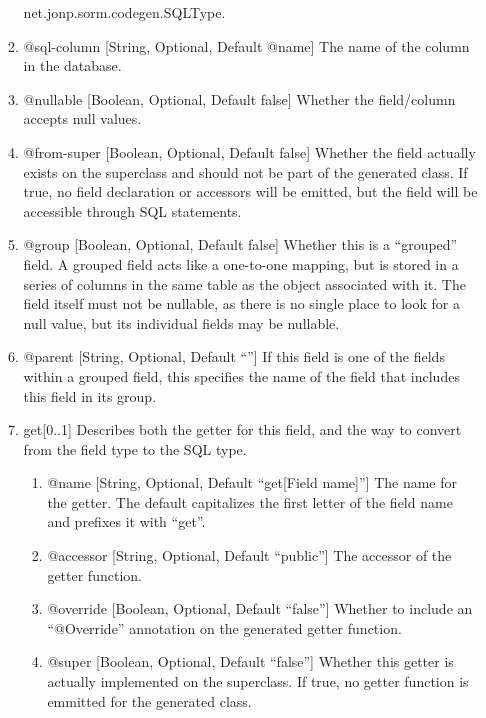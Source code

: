 \documentclass{book}
\begin{document}
\begin{enumerate}
\begin{enumerate}
              net.jonp.sorm.codegen.SQLType.
        \item @sql-column [String, Optional, Default @name] The name of the
              column in the database.
        \item @nullable [Boolean, Optional, Default false] Whether the
              field/column accepts null values.
        \item @from-super [Boolean, Optional, Default false] Whether the field
              actually exists on the superclass and should not be part of the
              generated class. If true, no field declaration or accessors will
              be emitted, but the field will be accessible through SQL
              statements.
        \item @group [Boolean, Optional, Default false] Whether this is a
              ``grouped'' field. A grouped field acts like a one-to-one mapping,
              but is stored in a series of columns in the same table as the
              object associated with it. The field itself must not be nullable,
              as there is no single place to look for a null value, but its
              individual fields may be nullable.
        \item @parent [String, Optional, Default ``''] If this field is one of
              the fields within a grouped field, this specifies the name of the
              field that includes this field in its group.
        \item get[0..1] Describes both the getter for this field, and the way to
              convert from the field type to the SQL type.
        \begin{enumerate}
            \item @name [String, Optional, Default ``get[Field name]''] The name
                  for the getter. The default capitalizes the first letter of
                  the field name and prefixes it with ``get''.
            \item @accessor [String, Optional, Default ``public''] The accessor
                  of the getter function.
            \item @override [Boolean, Optional, Default ``false''] Whether to
                  include an ``@Override'' annotation on the generated getter
                  function.
            \item @super [Boolean, Optional, Default ``false''] Whether this
                  getter is actually implemented on the superclass. If true,
                  no getter function is emmitted for the generated class.

\end{enumerate}
\end{enumerate}
\end{enumerate}
\end{document}
